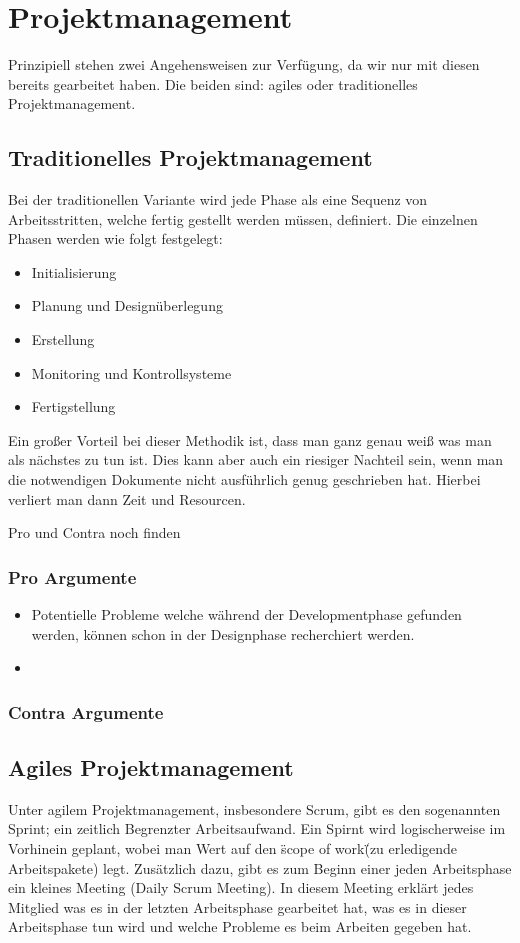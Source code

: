 \chapter{Projektmanagement}

Prinzipiell stehen zwei Angehensweisen zur Verfügung, da wir nur mit diesen bereits gearbeitet haben. Die beiden sind: agiles oder traditionelles Projektmanagement.

\section{Traditionelles Projektmanagement}
Bei der traditionellen Variante wird jede Phase als eine Sequenz von Arbeitsstritten, welche fertig gestellt werden müssen, definiert. Die einzelnen Phasen werden wie folgt festgelegt:
\begin{itemize}
		\item Initialisierung
		\item Planung und Designüberlegung
		\item Erstellung
		\item Monitoring und Kontrollsysteme
		\item Fertigstellung
\end{itemize}

Ein großer Vorteil bei dieser Methodik ist, dass man ganz genau weiß was man als nächstes zu tun ist. Dies kann aber auch ein riesiger Nachteil sein, wenn man die notwendigen Dokumente nicht ausführlich genug geschrieben hat. Hierbei verliert man dann Zeit und Resourcen.

\todo Pro und Contra noch finden
\subsection{Pro Argumente}
\begin{itemize}
		\item Potentielle Probleme welche während der Developmentphase gefunden werden, können schon in der Designphase recherchiert werden.
		\item 
\end{itemize}

\subsection{Contra Argumente}


\section{Agiles Projektmanagement}
Unter agilem Projektmanagement, insbesondere Scrum, gibt es den sogenannten Sprint; ein zeitlich Begrenzter Arbeitsaufwand. Ein Spirnt wird logischerweise im Vorhinein geplant, wobei man Wert auf den \"scope of work\" (zu erledigende Arbeitspakete) legt. Zusätzlich dazu, gibt es zum Beginn einer jeden Arbeitsphase ein kleines Meeting (Daily Scrum Meeting). In diesem Meeting erklärt jedes Mitglied was es in der letzten Arbeitsphase gearbeitet hat, was es in dieser Arbeitsphase tun wird und welche Probleme es beim Arbeiten gegeben hat.

